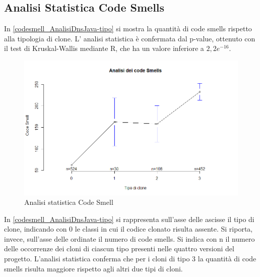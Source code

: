 \subsection{Analisi Statistica Code Smells}
In \autoref{codesmell_AnalisiDnsJava-tipo} si mostra la quantità di code smells rispetto alla tipologia di clone. L' analisi statistica è confermata dal p-value, ottenuto con il test di Kruskal-Wallis mediante R, che ha un valore inferiore a $2,2 e^{-16}$. \newpage
\begin{figure}[htbp]
	\centering
	\includegraphics[scale=0.5]{analisi_R/AnalisiDnsJava/2-gplot-codesmell-type.png}
\caption{Analisi statistica Code Smell}
\label{codesmell_AnalisiDnsJava-tipo}
\end{figure}
In \autoref{codesmell_AnalisiDnsJava-tipo}  si rappresenta sull'asse delle ascisse il tipo di clone, indicando con 0 le classi in cui il codice clonato risulta assente. Si riporta, invece, sull'asse delle ordinate il numero di code smells. Si indica con n il numero delle occorrenze dei cloni di ciascun tipo presenti nelle quattro versioni del progetto. L'analisi statistica conferma che per i cloni di tipo 3 la quantità di code smells risulta maggiore rispetto agli altri due tipi di cloni.
